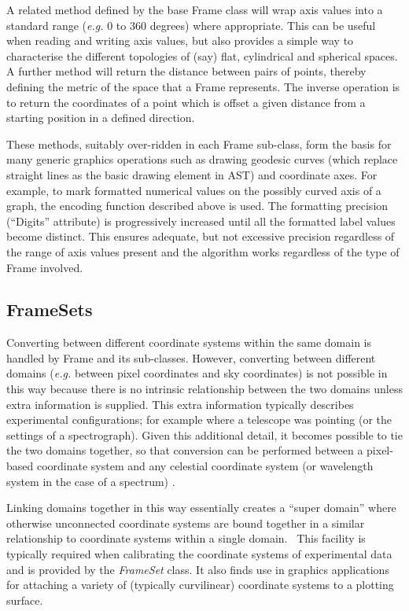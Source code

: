 \documentclass[final,authoryear,5p,times,twocolumn]{elsarticle}
\begin{document}
A related method defined by the base Frame class will wrap axis values
into a standard range (\emph{e.g.} 0 to 360 degrees) where appropriate.
This can be useful when reading and writing axis values, but also
provides a simple way to characterise the different topologies of (say)
flat, cylindrical and spherical spaces. A further method will return the
distance between pairs of points, thereby defining the metric of the space
that a Frame represents. The inverse operation is to return the
coordinates of a point which is offset a given distance from a starting
position in a defined direction.

These methods, suitably over-ridden in each Frame sub-class, form the
basis for many generic graphics operations such as drawing geodesic
curves (which replace straight lines as the basic drawing element in AST)
and coordinate axes. For example, to mark formatted numerical values on
the possibly curved axis of a graph, the encoding function described
above is used. The formatting precision (``Digits'' attribute) is
progressively increased until all the formatted label values become
distinct. This ensures adequate, but not excessive precision regardless
of the range of axis values present and the algorithm works regardless of
the type of Frame involved.


\subsection{FrameSets}

Converting between different coordinate systems within the same domain is
handled by Frame and its sub-classes. However, converting between
different domains (\emph{e.g.} between pixel coordinates and sky coordinates) is
not possible in this way because there is no intrinsic relationship
between the two domains unless extra information is supplied. This extra
information typically describes experimental configurations; for example
where a telescope was pointing (or the settings of a spectrograph). Given
this additional detail, it becomes possible to tie the two domains
together, so that conversion can be performed between a pixel-based
coordinate system and any celestial coordinate system (or wavelength
system in the case of a spectrum) .

Linking domains together in this way essentially creates a ``super
domain'' where otherwise unconnected coordinate systems are bound
together in a similar relationship to coordinate systems within a single
domain.  This facility is typically required when calibrating the
coordinate systems of experimental data and is provided by the
\emph{FrameSet} class. It also finds use in graphics applications for
attaching a variety of (typically curvilinear) coordinate systems to a
plotting surface.
\end{document}
